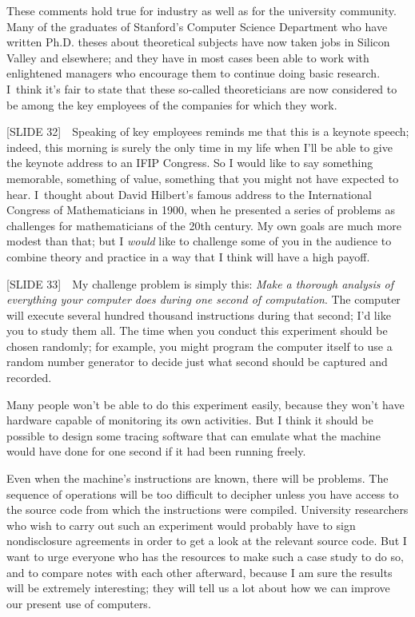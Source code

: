 These comments hold true for industry as well as for the university
community. Many of the graduates of Stanford's Computer Science
Department who have written Ph.D. theses about theoretical subjects
have now taken jobs in Silicon Valley and elsewhere; and they have in
most cases been able to work with enlightened managers who encourage
them to continue doing basic research. I~think it's fair to state that
these so-called theoreticians are now considered to be among the key
employees of the companies for which they work.

[SLIDE 32]\ \  Speaking of key employees reminds me that this is a
keynote speech; indeed, this morning is surely the only time in my
life when I'll be able to give the keynote address to an IFIP
Congress. 
So I would like to say something memorable, something of value,
something that you might not have expected to hear. I~thought about
David Hilbert's famous address to the International Congress of
Mathematicians in 1900, when he presented a series of problems as
challenges for mathematicians of the 20th century. My own goals are
much more modest than that; but I {\it would\/} like to challenge some
of you in the audience to combine theory and practice in a way that I
think will have a high payoff.

[SLIDE 33]\ \  My challenge problem is simply this: {\it Make a
thorough analysis of everything your computer does during one second
of computation}. The computer will execute several hundred thousand
instructions during that second; I'd like you to study them all. The
time when you conduct this experiment should be chosen randomly; for
example, you might program the computer itself to use a random number
generator to decide just what second should be captured and recorded.

Many people won't be able to do this experiment easily, because they
won't have hardware capable of monitoring its own activities. But I
think it should be possible to design some tracing software that can
emulate what the machine would have done for one second if it had been
running freely.

Even when the machine's instructions are known, there will be
problems.
The sequence of operations will be too difficult to decipher unless
you have access to the source  code from which the instructions were
compiled. University researchers who wish to carry out such an
experiment would probably have to sign nondisclosure agreements in
order to get a look at the relevant source code. But I want to urge
everyone who has the resources to make such a case study to do so, and
to compare notes with each other afterward, because I am sure the
results will be extremely interesting; they will tell us a lot about
how we can improve our present use of computers.

